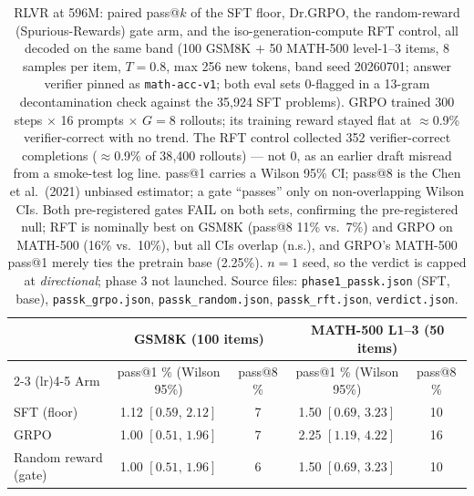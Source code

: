 \begin{table}[t]
\centering
\caption{RLVR at 596M: paired pass@$k$ of the SFT floor, Dr.GRPO, the random-reward (Spurious-Rewards) gate arm, and the iso-generation-compute RFT control, all decoded on the same band (100 GSM8K $+$ 50 MATH-500 level-1--3 items, 8 samples per item, $T{=}0.8$, max 256 new tokens, band seed 20260701; answer verifier pinned as \texttt{math-acc-v1}; both eval sets 0-flagged in a 13-gram decontamination check against the 35{,}924 SFT problems).
GRPO trained 300 steps $\times$ 16 prompts $\times$ $G{=}8$ rollouts; its training reward stayed flat at $\approx$0.9\% verifier-correct with no trend.
The RFT control collected 352 verifier-correct completions ($\approx$0.9\% of 38{,}400 rollouts) --- not 0, as an earlier draft misread from a smoke-test log line.
pass@1 carries a Wilson 95\% CI; pass@8 is the Chen et al.\ (2021) unbiased estimator; a gate ``passes'' only on non-overlapping Wilson CIs.
Both pre-registered gates FAIL on both sets, confirming the pre-registered null; RFT is nominally best on GSM8K (pass@8 11\% vs.\ 7\%) and GRPO on MATH-500 (16\% vs.\ 10\%), but all CIs overlap (n.s.), and GRPO's MATH-500 pass@1 merely ties the pretrain base (2.25\%).
$n{=}1$ seed, so the verdict is capped at \emph{directional}; phase 3 not launched.
Source files: \texttt{phase1\_passk.json} (SFT, base), \texttt{passk\_grpo.json}, \texttt{passk\_random.json}, \texttt{passk\_rft.json}, \texttt{verdict.json}.}
\label{tab:rlvr}
\footnotesize
\begin{tabular}{lcccc}
\toprule
 & \multicolumn{2}{c}{GSM8K (100 items)} & \multicolumn{2}{c}{MATH-500 L1--3 (50 items)} \\
\cmidrule(lr){2-3} \cmidrule(lr){4-5}
Arm & pass@1 \% (Wilson 95\%) & pass@8 \% & pass@1 \% (Wilson 95\%) & pass@8 \% \\
\midrule
SFT (floor)          & 1.12 $[0.59,\,2.12]$ & 7  & 1.50 $[0.69,\,3.23]$ & 10 \\
GRPO                 & 1.00 $[0.51,\,1.96]$ & 7  & 2.25 $[1.19,\,4.22]$ & 16 \\
Random reward (gate) & 1.00 $[0.51,\,1.96]$ & 6  & 1.50 $[0.69,\,3.23]$ & 10 \\

\end{tabular}
\end{table}
